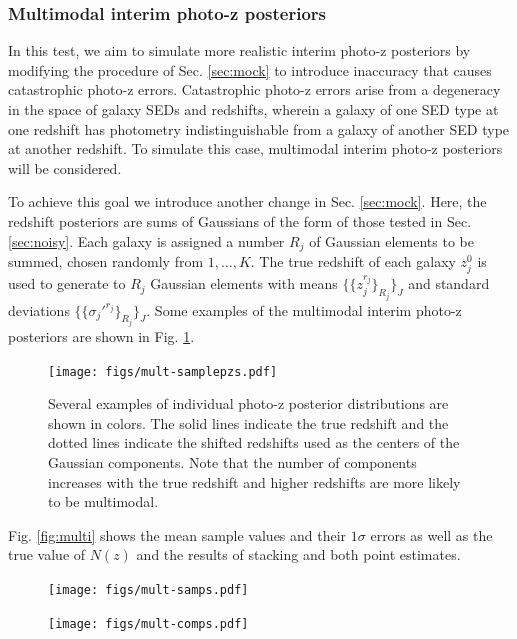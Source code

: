 \documentclass[preprint]{aastex}
\begin{document}
\clearpage
\subsubsection{Multimodal interim photo-z posteriors}
\label{sec:multi}

In this test, we aim to simulate more realistic interim photo-z posteriors by 
modifying the procedure of Sec. \ref{sec:mock} to introduce inaccuracy that 
causes catastrophic photo-z errors.  Catastrophic photo-z errors arise from a 
degeneracy in the space of galaxy SEDs and redshifts, wherein a galaxy of one 
SED type at one redshift has photometry indistinguishable from a galaxy of 
another SED type at another redshift.  To simulate this case, multimodal 
interim photo-z posteriors will be considered.

To achieve this goal we introduce another change in Sec. \ref{sec:mock}.  Here, 
the redshift posteriors are sums of Gaussians of the form of those tested in 
Sec. \ref{sec:noisy}.  Each galaxy is assigned a number $R_{j}$ of Gaussian 
elements to be summed, chosen randomly from $1,\dots,K$.  The true redshift of 
each galaxy $z_{j}^{0}$ is used to generate to $R_{j}$ Gaussian elements with 
means $\{\{z_{j}^{r_{j}}\}_{R_{j}}\}_{J}$ and standard deviations 
$\{\{\sigma_{j}'^{r_{j}}\}_{R_{j}}\}_{J}$.  Some examples of the multimodal 
interim photo-z posteriors are shown in Fig. \ref{fig:multipzs}.  

\begin{figure}
\texttt{[image: figs/mult-samplepzs.pdf]}
\caption{Several examples of individual photo-z posterior distributions are 
shown in colors.  The solid lines indicate the true redshift and the dotted 
lines indicate the shifted redshifts used as the centers of the Gaussian 
components.  Note that the number of components increases with the true 
redshift and higher redshifts are more likely to be multimodal.}
\label{fig:multipzs}
\end{figure}

Fig. \ref{fig:multi} shows the mean sample values and their $1\sigma$ errors as 
well as the true value of $N(z)$ and the results of stacking and both point 
estimates.

\begin{figure}
\texttt{[image: figs/mult-samps.pdf]}
\caption{}
\label{fig:multi-samp}
\end{figure}

\begin{figure}
\texttt{[image: figs/mult-comps.pdf]}
\caption{}
\label{fig:multi-comp}
\end{figure}
\end{document}
